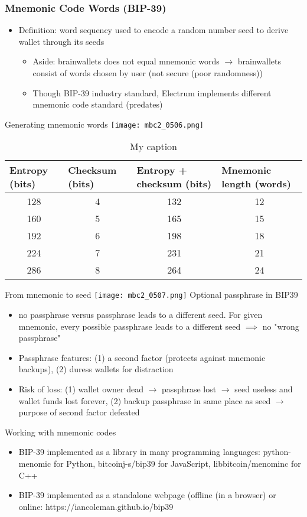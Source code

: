 \documentclass[english, 11pt]{article}
\begin{document}
\subsubsection{Mnemonic Code Words (BIP-39)}
\begin{itemize}
    \item Definition: word sequency used to encode a random number seed to derive wallet through its seeds
    \begin{itemize}
        \item Aside: brainwallets does not equal mnemonic words $\rightarrow$ brainwallets consist of words chosen by user (not secure (poor randomness))
        \item Though BIP-39 industry standard, Electrum implements different mnemonic code standard (predates)
    \end{itemize}
\end{itemize}
Generating mnemonic words
\newline
\texttt{[image: mbc2\_0506.png]}
\begin{table}[]
\centering
\caption{My caption}
\label{my-label}
\begin{tabular}{|c|c|c|c|}
\hline
\multicolumn{1}{|l|}{\textbf{Entropy (bits)}} & \multicolumn{1}{l|}{\textbf{Checksum (bits)}} & \multicolumn{1}{l|}{\textbf{Entropy + checksum (bits)}} & \multicolumn{1}{l|}{\textbf{Mnemonic length (words)}} \\ \hline
128 & 4 & 132 & 12 \\ \hline
160 & 5 & 165 & 15 \\ \hline
192 & 6 & 198 & 18 \\ \hline
224 & 7 & 231 & 21 \\ \hline
286 & 8 & 264 & 24 \\ \hline
\end{tabular}
\end{table}
From mnemonic to seed
\newline
\texttt{[image: mbc2\_0507.png]}
Optional passphrase in BIP39
\begin{itemize}
    \item no passphrase versus passphrase leads to a different seed. For given mnemonic, every possible passphrase leads to a different seed $\implies$ no "wrong passphrase"
    \item Passphrase features: (1) a second factor (protects against mnemonic backups), (2) duress wallets for distraction
    \item Risk of loss: (1) wallet owner dead $\rightarrow$ passphrase lost $\rightarrow$ seed useless and wallet funds lost forever, (2) backup passphrase in same place as seed $\rightarrow$ purpose of second factor defeated
\end{itemize}
Working with mnemonic codes
\begin{itemize}
    \item BIP-39 implemented as a library in many programming languages: python-menomic for Python, bitcoinj-s/bip39 for JavaScript, libbitcoin/menominc for C++
    \item BIP-39 implemented as a standalone webpage (offline (in a browser) or online: https://iancoleman.github.io/bip39
\end{itemize}
\end{document}
